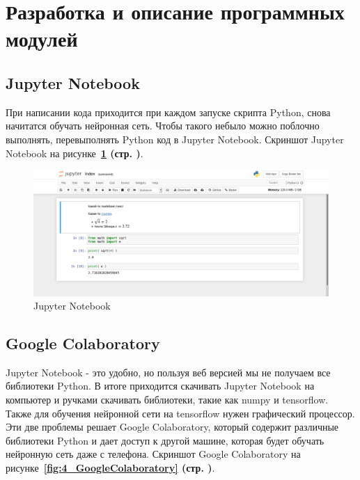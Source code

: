 \section{Разработка и описание программных модулей}



\subsection{Jupyter Notebook}

При написании кода приходится при каждом запуске скрипта Python,
снова начитатся обучать нейронная сеть.
Чтобы такого небыло можно поблочно выполнять, перевыполнять Python код в Jupyter Notebook.
Скриншот Jupyter Notebook на
рисунке~\textbf{\ref{fig:4_JupyterNotebook} (стр. \pageref{fig:4_JupyterNotebook})}.

\begin{figure}[!htbp]
    \centering
    \includegraphics[width=16cm]
    {_INCLUDES/main/4/JupyterNotebook.png}
    \caption{Jupyter Notebook}
    \label{fig:4_JupyterNotebook}
\end{figure}



\subsection{Google Colaboratory}

Jupyter Notebook - это удобно, но пользуя веб версией мы не получаем все библиотеки Python.
В итоге приходится скачивать Jupyter Notebook на компьютер и ручками скачивать библиотеки,
такие как numpy и tensorflow. Также для обучения нейронной сети на tensorflow нужен графический процессор. Эти две проблемы решает Google Colaboratory, который содержит различные библиотеки Python и дает доступ к другой машине, которая будет обучать нейронную сеть даже с телефона.
Скриншот Google Colaboratory на
рисунке~\textbf{\ref{fig:4_GoogleColaboratory} (стр. \pageref{fig:4_GoogleColaboratory})}.

